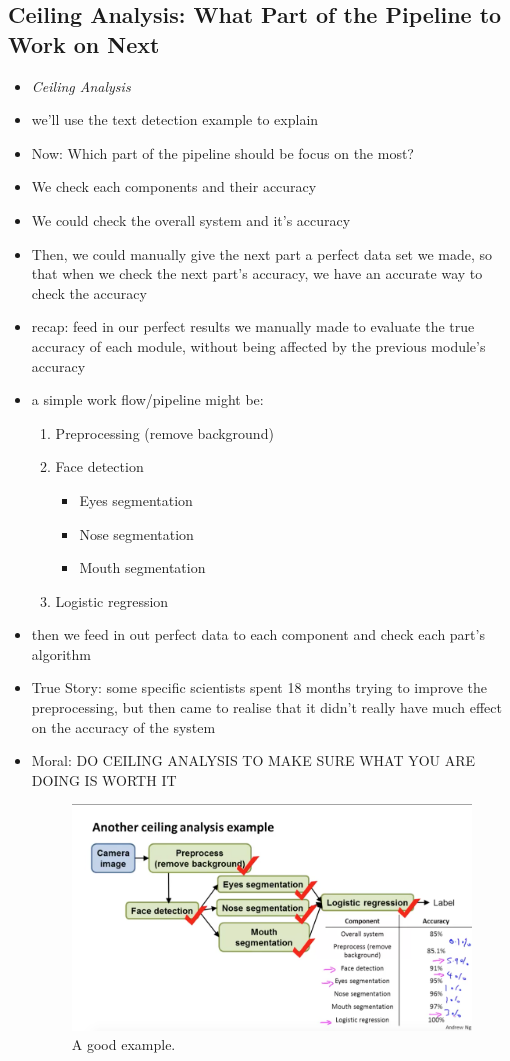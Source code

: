 \documentclass[]{article}
\begin{document}
	\subsection{Ceiling Analysis: What Part of the Pipeline to Work on Next}
		\begin{itemize}
			\item \emph{Ceiling Analysis}
			\item we'll use the text detection example to explain
			\item Now: Which part of the pipeline should be focus on the most?
			\item We check each components and their accuracy
			\item We could check the overall system and it's accuracy
			\item Then, we could manually give the next part a perfect data set we made, so that when we check the next part's accuracy, we have an accurate way to check the accuracy
			\item recap: feed in our perfect results we manually made to evaluate the true accuracy of each module, without being affected by the previous module's accuracy
			\item a simple work flow/pipeline might be:
			\begin{enumerate}
				\item Preprocessing (remove background)
				\item Face detection
				\begin{itemize}
					\item Eyes segmentation
					\item Nose segmentation
					\item Mouth segmentation
				\end{itemize}
				\item Logistic regression
			\end{enumerate}
			\item then we feed in out perfect data to each component and check each part's algorithm
			\item True Story: some specific scientists spent 18 months trying to improve the preprocessing, but then came to realise that it didn't really have much effect on the accuracy of the system
			\item Moral: DO CEILING ANALYSIS TO MAKE SURE WHAT YOU ARE DOING IS WORTH IT
			\begin{figure}[ht!]
				\includegraphics[width= 1.5\textwidth,center]{Ceiling_Analysis_Example.png}
				\caption{A good example.}
			\end{figure}
		\end{itemize}
\end{document}
